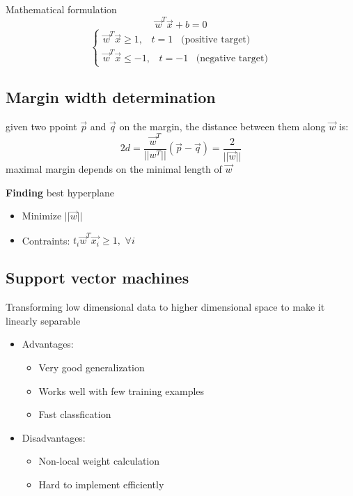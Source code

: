 \documentclass[12pt,a4paper]{article}
\begin{document}
Mathematical formulation
\[
\vec{w}^T \vec{x} + b = 0
\]
\[
\begin{cases}
    \vec{w}^T \vec{x} \geq 1, \hspace{10pt} t = 1 \hspace{10pt} \text{(positive target)}\\
    \vec{w}^T \vec{x} \leq -1, \hspace{10pt} t = -1 \hspace{10pt} \text{(negative target)}
\end{cases}
\]

\subsection{Margin width determination}
given two ppoint $\vec{p}$ and $\vec{q}$ on the margin, the distance between them along $\vec{w}$ is:
\[
2d = \frac{\vec{w}^T}{||w^T||}(\vec{p} - \vec{q}) = \frac{2}{||\vec{w}||}
\]
maximal margin depends on the minimal length of $\vec{w}$
\vspace{10pt}


\textbf{Finding} best hyperplane
\begin{itemize}
    \item Minimize $||\vec{w}||$ 
    \item Contraints: $t_i \vec{w}^T \vec{x_i} \geq 1,$ \hspace{5pt}$\forall i$
\end{itemize}

\subsection{Support vector machines}
Transforming low dimensional data to higher dimensional space to make it linearly separable
\begin{itemize}
    \item Advantages:
    \begin{itemize}
        \item Very good generalization 
        \item Works well with few training examples
        \item Fast classfication
    \end{itemize}
    \item Disadvantages:
    \begin{itemize}
        \item Non-local weight calculation  
        \item Hard to implement efficiently
    \end{itemize}
\end{itemize}
\end{document}
